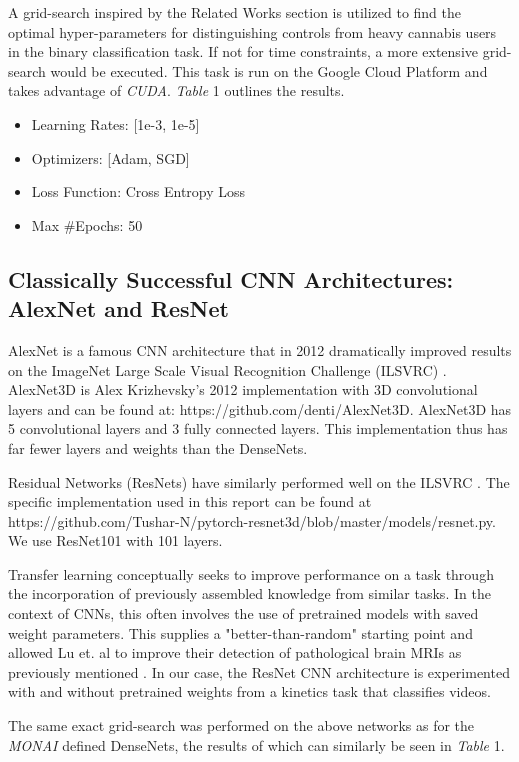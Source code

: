 \documentclass[conference]{IEEEtran}
\begin{document}
A grid-search inspired by the Related Works section is utilized to find the optimal hyper-parameters for distinguishing controls from heavy cannabis users in the binary classification task. If not for time constraints, a more extensive grid-search would be executed. This task is run on the Google Cloud Platform and takes advantage of \textit{CUDA}. \textit{Table} 1 outlines the results. 

\begin{itemize}
    \item Learning Rates: [1e-3, 1e-5]
    \item Optimizers: [Adam, SGD]
    \item Loss Function: Cross Entropy Loss
    \item Max #Epochs: 50
\end{itemize}


\subsection{Classically Successful CNN Architectures: AlexNet and ResNet}

AlexNet is a famous CNN architecture that in 2012 dramatically improved results on the ImageNet Large Scale Visual Recognition Challenge (ILSVRC) \cite{Alom}. AlexNet3D is Alex Krizhevsky’s 2012 implementation with 3D convolutional layers and can be found at: https://github.com/denti/AlexNet3D. AlexNet3D has 5 convolutional layers and 3 fully connected layers. This implementation thus has far fewer layers and weights than the DenseNets.

Residual Networks (ResNets) have similarly performed well on the ILSVRC \cite{Data}. The specific implementation used in this report can be found at https://github.com/Tushar-N/pytorch-resnet3d/blob/master/models/resnet.py. We use ResNet101 with 101 layers.

Transfer learning conceptually seeks to improve performance on a task through the incorporation of previously assembled knowledge from similar tasks. In the context of CNNs, this often involves the use of pretrained models with saved weight parameters. This supplies a "better-than-random" starting point and allowed Lu et. al to improve their detection of pathological brain MRIs as previously mentioned \cite{Lu}. In our case, the ResNet CNN architecture is experimented with and without pretrained weights from a kinetics task that classifies videos.

The same exact grid-search was performed on the above networks as for the \textit{MONAI} defined DenseNets, the results of which can similarly be seen in \textit{Table} 1. 
\end{document}

